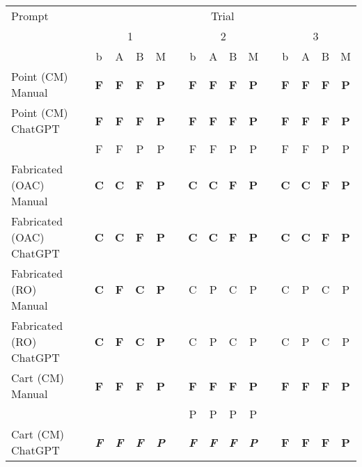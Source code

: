 \begin{table}[t]
    \centering
    \begin{tabular}{@{\extracolsep{\fill}} llcccccccccccccc}
        \toprule
        Prompt & & \multicolumn{14}{c}{Trial} \\
        \cmidrule(lr){3-16}
        & & \multicolumn{4}{c}{1} & \multicolumn{6}{c}{2} & \multicolumn{4}{c}{3} \\
                            & & b & A & B & M & & b & A & B & M & & b & A & B & M \\
\midrule
Point (CM) Manual           & & \textbf{F} & \textbf{F} & \textbf{F} & \textbf{P} & & \textbf{F} & \textbf{F} & \textbf{F} & \textbf{P} & & \textbf{F} & \textbf{F} & \textbf{F} & \textbf{P} \\
Point (CM) ChatGPT          & & \textbf{F} & \textbf{F} & \textbf{F} & \textbf{P} & & \textbf{F} & \textbf{F} & \textbf{F} & \textbf{P} & & \textbf{F} & \textbf{F} & \textbf{F} & \textbf{P} \\
                            & & F & F & P & P & & F & F & P & P & & F & F & P & P \\
Fabricated (OAC) Manual     & & \textbf{C} & \textbf{C} & \textbf{F} & \textbf{P} & & \textbf{C} & \textbf{C} & \textbf{F} & \textbf{P} & & \textbf{C} & \textbf{C} & \textbf{F} & \textbf{P} \\
Fabricated (OAC) ChatGPT    & & \textbf{C} & \textbf{C} & \textbf{F} & \textbf{P} & & \textbf{C} & \textbf{C} & \textbf{F} & \textbf{P} & & \textbf{C} & \textbf{C} & \textbf{F} & \textbf{P} \\
Fabricated (RO) Manual      & & \textbf{C} & \textbf{F} & \textbf{C} & \textbf{P} & & C & P & C & P & & C & P & C & P \\
Fabricated (RO) ChatGPT     & & \textbf{C} & \textbf{F} & \textbf{C} & \textbf{P} & & C & P & C & P & & C & P & C & P \\
Cart (CM) Manual            & & \textbf{F} & \textbf{F} & \textbf{F} & \textbf{P} & & \textbf{F} & \textbf{F} & \textbf{F} & \textbf{P} & & \textbf{F} & \textbf{F} & \textbf{F} & \textbf{P} \\
                            & &   &   &   &   & & P & P & P & P & &   &   &   &   \\
Cart (CM) ChatGPT           & & \textbf{\textit{F}} & \textbf{\textit{F}} & \textbf{\textit{F}} & \textbf{\textit{P}} & & \textbf{\textit{F}} & \textbf{\textit{F}} & \textbf{\textit{F}} & \textbf{\textit{P}} & & \textbf{F} & \textbf{F} & \textbf{F} & \textbf{P} \\ %

\end{tabular}
\end{table}
